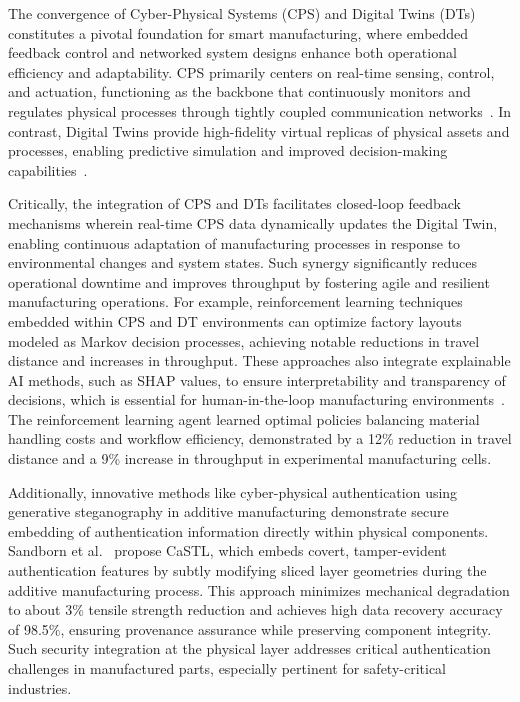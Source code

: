 \documentclass[sigconf]{acmart}
\begin{document}
The convergence of Cyber-Physical Systems (CPS) and Digital Twins (DTs) constitutes a pivotal foundation for smart manufacturing, where embedded feedback control and networked system designs enhance both operational efficiency and adaptability. CPS primarily centers on real-time sensing, control, and actuation, functioning as the backbone that continuously monitors and regulates physical processes through tightly coupled communication networks~\cite{ref9}. In contrast, Digital Twins provide high-fidelity virtual replicas of physical assets and processes, enabling predictive simulation and improved decision-making capabilities~\cite{ref12}.

Critically, the integration of CPS and DTs facilitates closed-loop feedback mechanisms wherein real-time CPS data dynamically updates the Digital Twin, enabling continuous adaptation of manufacturing processes in response to environmental changes and system states. Such synergy significantly reduces operational downtime and improves throughput by fostering agile and resilient manufacturing operations. For example, reinforcement learning techniques embedded within CPS and DT environments can optimize factory layouts modeled as Markov decision processes, achieving notable reductions in travel distance and increases in throughput. These approaches also integrate explainable AI methods, such as SHAP values, to ensure interpretability and transparency of decisions, which is essential for human-in-the-loop manufacturing environments~\cite{ref9}. The reinforcement learning agent learned optimal policies balancing material handling costs and workflow efficiency, demonstrated by a 12\% reduction in travel distance and a 9\% increase in throughput in experimental manufacturing cells.

Additionally, innovative methods like cyber-physical authentication using generative steganography in additive manufacturing demonstrate secure embedding of authentication information directly within physical components. Sandborn et al.~\cite{ref10} propose CaSTL, which embeds covert, tamper-evident authentication features by subtly modifying sliced layer geometries during the additive manufacturing process. This approach minimizes mechanical degradation to about 3\% tensile strength reduction and achieves high data recovery accuracy of 98.5\%, ensuring provenance assurance while preserving component integrity. Such security integration at the physical layer addresses critical authentication challenges in manufactured parts, especially pertinent for safety-critical industries.
\end{document}
